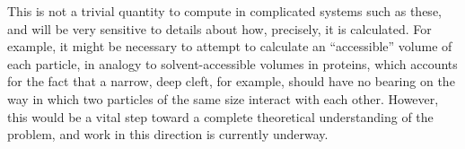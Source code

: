 This is not a trivial quantity to compute in complicated systems such as these, and will be very sensitive to details about how, precisely, it is calculated.
For example, it might be necessary to attempt to calculate an ``accessible'' volume of each particle, in analogy to solvent-accessible volumes in proteins, which accounts for the fact that a narrow, deep cleft, for example, should have no bearing on the way in which two particles of the same size interact with each other.
However, this would be a vital step toward a complete theoretical understanding of the problem, and work in this direction is currently underway.
